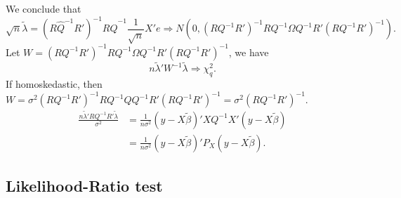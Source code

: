 \documentclass[11pt]{article}
\begin{document}
We conclude that
\[
\sqrt{n}\tilde{\lambda}=\left(R\widehat{Q}^{-1}R'\right)^{-1}R\widehat{Q}^{-1}\frac{1}{\sqrt{n}}X'e \Rightarrow N\left(0,\left(RQ^{-1}R'\right)^{-1}RQ^{-1}\Omega Q^{-1}R'\left(RQ^{-1}R'\right)^{-1}\right).\]
Let
\(W=\left(RQ^{-1}R'\right)^{-1}RQ^{-1}\Omega Q^{-1}R'\left(RQ^{-1}R'\right)^{-1}\),
we have
\[n\tilde{\lambda}'W^{-1}\tilde{\lambda}\Rightarrow\chi_{q}^{2}.\] If
homoskedastic, then
\(W=\sigma^{2}\left(RQ^{-1}R'\right)^{-1}RQ^{-1}QQ^{-1}R'\left(RQ^{-1}R'\right)^{-1}=\sigma^{2}\left(RQ^{-1}R'\right)^{-1}.\)
\[\begin{aligned}
\frac{n\tilde{\lambda}'RQ^{-1}R'\tilde{\lambda}}{\sigma^{2}} & =\frac{1}{n\sigma^{2}}\left(y-X\tilde{\beta}\right)'XQ^{-1}X'\left(y-X\tilde{\beta}\right)\\
 & =\frac{1}{n\sigma^{2}}\left(y-X\tilde{\beta}\right)'P_{X}\left(y-X\tilde{\beta}\right).\end{aligned}\]

    \subsection{Likelihood-Ratio test}\label{likelihood-ratio-test}
\end{document}
